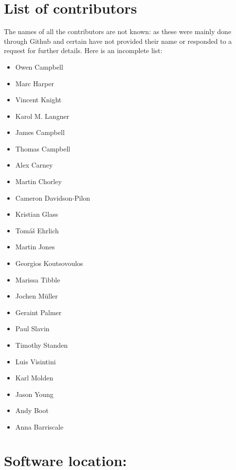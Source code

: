 \documentclass{jors}
\begin{document}
\section*{List of contributors}

The names of all the contributors are not known: as these were mainly done
through Github and certain have not provided their name or responded to a
request for further details. Here is an incomplete list:

\begin{multicols}{2}
    \begin{itemize}[noitemsep,topsep=0pt]
        \item {Owen Campbell}
        \item {Marc Harper}
        \item {Vincent Knight}
        \item {Karol M. Langner}
        \item {James Campbell}
        \item {Thomas Campbell}
        \item {Alex Carney}
        \item {Martin Chorley}
        \item {Cameron Davidson-Pilon}
        \item {Kristian Glass}
        \item {Tom{\'a}{\v s} Ehrlich}
        \item {Martin Jones}
        \item {Georgios Koutsovoulos}
        \item {Marissa Tibble}
        \item {Jochen M{\"u}ller}
        \item {Geraint Palmer}
        \item {Paul Slavin}
        \item {Timothy Standen}
        \item {Luis Visintini}
        \item {Karl Molden}
        \item {Jason Young}
        \item {Andy Boot}
        \item {Anna Barriscale}
    \end{itemize}
\end{multicols}

\section*{Software location:}
\end{document}
